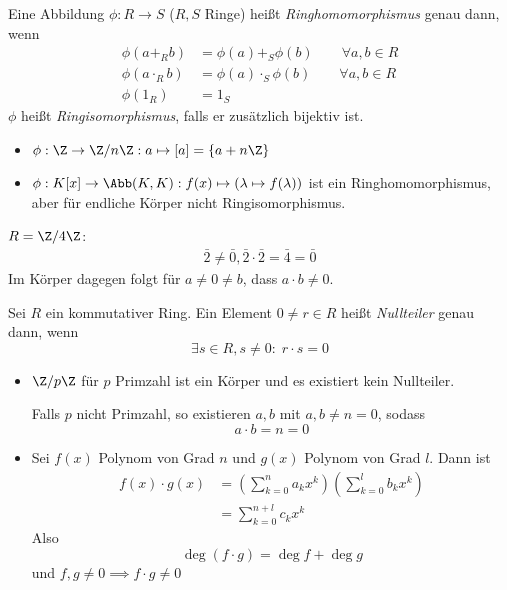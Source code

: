 \documentclass[a4paper, 10pt]{scrbook}
\begin{document}
\begin{df}
\label{df:10.9}
Eine Abbildung $\phi:R\to S$ ($R, S$ Ringe) heißt \emph{Ringhomomorphismus} genau dann, wenn
\begin{align*}
\phi(a+_R b) &= \phi(a) +_S \phi(b) \qquad \forall a,b\in R\\
\phi(a \cdot_R b) &= \phi(a) \cdot_S \phi(b) \qquad \forall a,b\in R \\
\phi(1_R)&= 1_S
\end{align*}
$\phi$ heißt \emph{Ringisomorphismus}, falls er zusätzlich bijektiv ist.
\end{df}

\begin{ex}
\begin{itemize}
\item $\phi:\Z\to \Z/n\Z:a\mapsto [a]=\{a+n\Z\}$
\item $\phi: K[x]\to \Abb(K,K):f(x)\mapsto (\lambda\mapsto f(\lambda))$ ist ein Ringhomomorphismus, aber für endliche Körper nicht Ringisomorphismus.
\end{itemize}
\end{ex}

$R=\Z/4\Z$:
\begin{align*}
\bar2\neq \bar0, \bar2\cdot \bar2=\bar4=\bar0
\end{align*}
Im Körper dagegen folgt für $a\neq 0\neq b$, dass $a\cdot b\neq 0$.

\begin{df}
\label{df:10.10}
Sei $R$ ein kommutativer Ring.
Ein Element $0\neq r\in R$ heißt \emph{Nullteiler} genau dann, wenn
\[
\exists s\in R, s\neq 0:\; r\cdot s=0
\]
\end{df}

\begin{ex}
\begin{itemize}
\item
$\Z/p\Z$ für $p$ Primzahl ist ein Körper und es existiert kein Nullteiler.

Falls $p$ nicht Primzahl, so existieren $a,b$ mit $a,b\neq n=0$, sodass
\[
a\cdot b=n=0
\]
\item
Sei $f(x)$ Polynom von Grad $n$ und $g(x)$ Polynom von Grad $l$.
Dann ist
\begin{align*}
f(x)\cdot g(x) &= \left(\sum_{k=0}^na_kx^k\right)\left(\sum_{k=0}^lb_kx^k\right) \\
&=\sum_{k=0}^{n+l}c_kx^k
\end{align*}
Also
\[
\deg(f\cdot g)=\deg f +\deg g
\]
und $f,g\neq 0 \implies f\cdot g\neq 0$
\end{itemize}
\end{ex}
\end{document}
